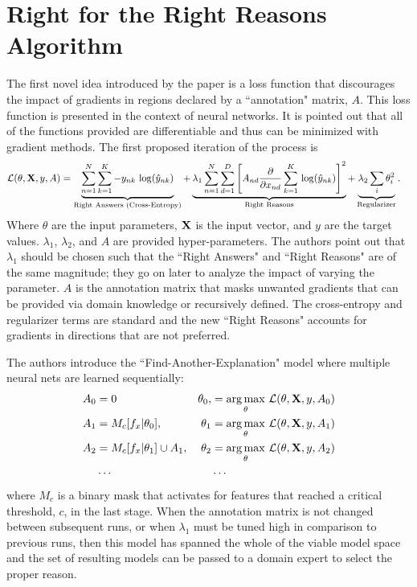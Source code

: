 \documentclass[twoside,11pt]{article}
\DeclareMathOperator*{\argmax}{arg\,max}
\begin{document}

\section{Right for the Right Reasons Algorithm}
\label{sec:RRR alg}
The first novel idea introduced by the paper is a loss function that discourages the impact of gradients in regions declared by a ``annotation" matrix, $A$. This loss function is presented in the context of neural networks. It is pointed out that all of the functions provided are differentiable and thus can be minimized with gradient methods. The first proposed iteration of the process is 
\begin{align}
\mathcal{L}(\theta, \vb{X}, y, A) &  = \underbrace{\sum^N_{n=1}\sum^K_{k=1}-y_{nk}\,\log(\hat{y}_{nk})}_\text{Right Answers (Cross-Entropy)} + \underbrace{\lambda_1 \sum^N_{n=1}\sum^D_{d=1}\left[A_{nd}\pdv{x_{nd}}\sum^K_{k=1}\, \log(\hat{y}_{nk})\right]^2}_\text{Right Reasons} + \underbrace{\lambda_2 \sum_i \theta^2_i}_\text{Regularizer}.
\label{fn:1}
\end{align}
Where $\theta$ are the input parameters, $\vb{X}$ is the input vector, and $y$ are the target values. $\lambda_1$, $\lambda_2$, and $A$ are provided hyper-parameters. The authors point out that $\lambda_1$ should be chosen such that the ``Right Answers" and ``Right Reasons" are of the same magnitude; they go on later to analyze the impact of varying the parameter. $A$ is the annotation matrix that masks unwanted gradients that can be provided via domain knowledge or recursively defined. The cross-entropy and regularizer terms are standard and the new ``Right Reasons" accounts for gradients in directions that are not preferred. 

The authors introduce the ``Find-Another-Explanation" model where multiple neural nets are learned sequentially:
\begin{align*}
A_0 & = 0 & \theta_0, & = \argmax_\theta \, \mathcal{L}(\theta, \vb{X}, y, A_0)\\
A_1 & = M_c[f_x|\theta_0], & \theta_1 & = \argmax_\theta \, \mathcal{L}(\theta, \vb{X}, y, A_1)\\
A_2 & = M_c[f_x|\theta_1]\cup A_1, & \theta_2 & = \argmax_\theta \, \mathcal{L}(\theta, \vb{X}, y, A_2)\\
&\cdots & &\cdots
\end{align*}
where $M_c$ is a binary mask that activates for features that reached a critical threshold, $c$, in the last stage. When the annotation matrix is not changed between subsequent runs, or when $\lambda_1$ must be tuned high in comparison to previous runs, then this model has spanned the whole of the viable model space and the set of resulting models can be passed to a  domain expert to select the proper reason. 
\end{document}
